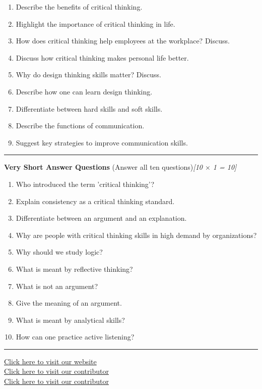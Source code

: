 \documentclass[11pt,a4paper]{article}
\newcommand{\pts}[1]{\hfill   \textit{[#1]}}
\begin{document}
\begin{enumerate}[label=\alph*.,leftmargin=*,itemsep=8pt]
  \item Describe the benefits of critical thinking.
  \item Highlight the importance of critical thinking in life.
  \item How does critical thinking help employees at the workplace? Discuss.
  \item Discuss how critical thinking makes personal life better.
  \item Why do design thinking skills matter? Discuss.
  \item Describe how one can learn design thinking.
  \item Differentiate between hard skills and soft skills.
  \item Describe the functions of communication.
  \item Suggest key strategies to improve communication skills.
\end{enumerate}

\bigskip



\rule{\linewidth}{0.4pt}\smallskip




\noindent   \textbf{Very Short Answer Questions} (Answer all ten questions)\pts{10 $ \times$ 1 = 10}

\begin{enumerate}[label=(\roman*),leftmargin=*,itemsep=6pt]
  \item Who introduced the term 'critical thinking'?
  \item Explain consistency as a critical thinking standard.
  \item Differentiate between an argument and an explanation.
  \item Why are people with critical thinking skills in high demand by organizations?
  \item Why should we study logic?
  \item What is meant by reflective thinking?
  \item What is not an argument?
  \item Give the meaning of an argument.
  \item What is meant by analytical skills?
  \item How can one practice active listening?
\end{enumerate}

\vfill
\rule{\linewidth}{0.4pt}

\begin{center}\small
\href{https://bhu-exam.vercel.app/}{Click here to visit our website}\\[4pt]\href{https://me-aryan.vercel.app/}{Click here to visit our contributor}\\[4pt]\href{https://quashan-me.vercel.app/}{Click here to visit our contributor}
\end{center}
\end{document}
